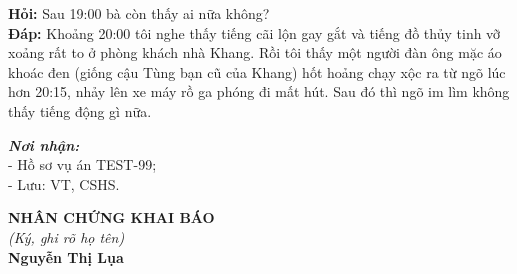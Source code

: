 \documentclass[12pt,a4paper]{article}
\begin{document}
\noindent \textbf{Hỏi:} Sau 19:00 bà còn thấy ai nữa không?\\
\textbf{Đáp:} Khoảng 20:00 tôi nghe thấy tiếng cãi lộn gay gắt và tiếng đồ thủy tinh vỡ xoảng rất to ở phòng khách nhà Khang. Rồi tôi thấy một người đàn ông mặc áo khoác đen (giống cậu Tùng bạn cũ của Khang) hốt hoảng chạy xộc ra từ ngõ lúc hơn 20:15, nhảy lên xe máy rồ ga phóng đi mất hút. Sau đó thì ngõ im lìm không thấy tiếng động gì nữa.

\vspace{0.8cm}

\noindent
\begin{minipage}[t]{0.45\textwidth}
    \small
    \textbf{\textit{Nơi nhận:}}\\
    - Hồ sơ vụ án TEST-99;\\
    - Lưu: VT, CSHS.
\end{minipage}
\hfill
\begin{minipage}[t]{0.5\textwidth}
    \begin{center}
        \small
        \textbf{NHÂN CHỨNG KHAI BÁO}\\
        \textit{(Ký, ghi rõ họ tên)}\\[1.5cm]
        \textbf{Nguyễn Thị Lụa}
    \end{center}
\end{minipage}
\end{document}
